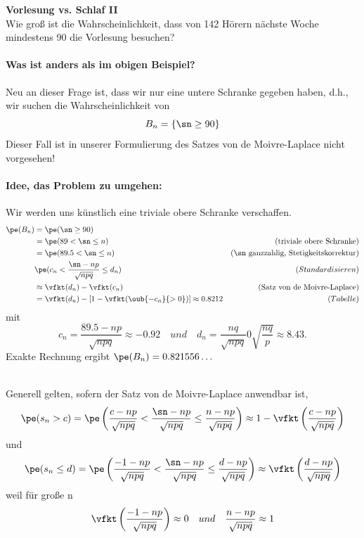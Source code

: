 \begin{bsp}
    \textbf{Vorlesung vs. Schlaf II}  \\

    Wie groß ist die Wahrscheinlichkeit, dass
    von 142 Hörern nächste Woche mindestens
    90 die Vorlesung besuchen?

    \paragraph{Was ist anders als im obigen Beispiel?} Neu an dieser Frage ist, dass wir nur eine untere Schranke gegeben haben,
    d.h., wir suchen die Wahrscheinlichkeit von
    \[
        B_n = \{\sn \geq 90\}
    \]
    Dieser Fall ist in unserer Formulierung des Satzes von de Moivre-Laplace nicht
    vorgesehen!

    \paragraph{Idee, das Problem zu umgehen:} Wir werden uns künstlich eine triviale obere Schranke verschaffen.
    \begin{align*}
        \pe(B_n) & = \pe(\sn \geq 90) \\
        & = \pe(89 < \sn \leq n ) & \text{(triviale obere Schranke)} \\
        & = \pe(89.5 < \sn \leq n ) & (\sn\text{ ganzzahlig, Stetigkeitskorrektur)} \\
        & \pe( c_n < \frac{\sn - np}{\sqrt{npq}} \leq d_n ) & (Standardisieren) \\
        & \approx \vfkt(d_n) - \vfkt(c_n) & \text{(Satz von de Moivre-Laplace)} \\
        & = \vfkt(d_n) - [1- \vfkt( \oub{-c_n}{>0} )] \approx 0.8212 & (Tabelle)
    \end{align*}
    mit \[
            c_n = \frac{89.5 - np}{\sqrt{npq}} \approx -0.92 \quad und \quad d_n = \frac{nq}{\sqrt{npq}} 0 \sqrt{\frac{nq}{p}} \approx 8.43.
    \]
    Exakte Rechnung ergibt $\pe(B_n) = 0.821556 \dots$
\end{bsp}

\begin{bem}  \\
    Generell gelten, sofern der Satz von de Moivre-Laplace anwendbar ist,
    \[
        \pe (s_n > c) = \pe\left(
        \frac{c-np}{\sqrt{npq}} < \frac{\sn-np}{\sqrt{npq}} \leq \frac{n-np}{\sqrt{npq}}
        \right) \approx 1 - \vfkt\left(\frac{c-np}{\sqrt{npq}}\right)
    \]
    und
    \[
        \pe (s_n \leq d) = \pe\left(
        \frac{-1-np}{\sqrt{npq}} < \frac{\sn-np}{\sqrt{npq}} \leq \frac{d-np}{\sqrt{npq}}
        \right) \approx \vfkt\left(\frac{d-np}{\sqrt{npq}}\right)
    \]
    weil für große n
    \[
        \vfkt\left(\frac{-1-np}{\sqrt{npq}}\right) \approx 0 \quad und \quad \frac{n-np}{\sqrt{npq}} \approx 1
    \]
\end{bem}